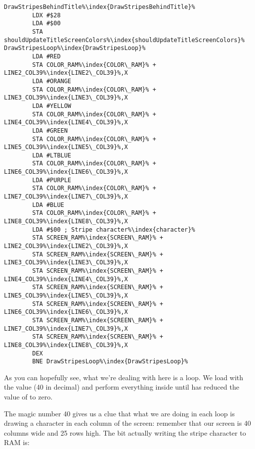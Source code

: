 \begin{lstlisting}[caption=The 'stripe' character\index{character}.,escapechar=\%]
DrawStripesBehindTitle%\index{DrawStripesBehindTitle}%
        LDX #$28
        LDA #$00
        STA shouldUpdateTitleScreenColors%\index{shouldUpdateTitleScreenColors}%
DrawStripesLoop%\index{DrawStripesLoop}%   
        LDA #RED
        STA COLOR_RAM%\index{COLOR\_RAM}% + LINE2_COL39%\index{LINE2\_COL39}%,X
        LDA #ORANGE
        STA COLOR_RAM%\index{COLOR\_RAM}% + LINE3_COL39%\index{LINE3\_COL39}%,X
        LDA #YELLOW
        STA COLOR_RAM%\index{COLOR\_RAM}% + LINE4_COL39%\index{LINE4\_COL39}%,X
        LDA #GREEN
        STA COLOR_RAM%\index{COLOR\_RAM}% + LINE5_COL39%\index{LINE5\_COL39}%,X
        LDA #LTBLUE
        STA COLOR_RAM%\index{COLOR\_RAM}% + LINE6_COL39%\index{LINE6\_COL39}%,X
        LDA #PURPLE
        STA COLOR_RAM%\index{COLOR\_RAM}% + LINE7_COL39%\index{LINE7\_COL39}%,X
        LDA #BLUE
        STA COLOR_RAM%\index{COLOR\_RAM}% + LINE8_COL39%\index{LINE8\_COL39}%,X
        LDA #$00 ; Stripe character%\index{character}%
        STA SCREEN_RAM%\index{SCREEN\_RAM}% + LINE2_COL39%\index{LINE2\_COL39}%,X
        STA SCREEN_RAM%\index{SCREEN\_RAM}% + LINE3_COL39%\index{LINE3\_COL39}%,X
        STA SCREEN_RAM%\index{SCREEN\_RAM}% + LINE4_COL39%\index{LINE4\_COL39}%,X
        STA SCREEN_RAM%\index{SCREEN\_RAM}% + LINE5_COL39%\index{LINE5\_COL39}%,X
        STA SCREEN_RAM%\index{SCREEN\_RAM}% + LINE6_COL39%\index{LINE6\_COL39}%,X
        STA SCREEN_RAM%\index{SCREEN\_RAM}% + LINE7_COL39%\index{LINE7\_COL39}%,X
        STA SCREEN_RAM%\index{SCREEN\_RAM}% + LINE8_COL39%\index{LINE8\_COL39}%,X
        DEX
        BNE DrawStripesLoop%\index{DrawStripesLoop}%

\end{lstlisting}

As you can hopefully see, what we're dealing with here is a loop. We load  with the value  (40 in decimal)
and perform everything inside  until  has reduced the value of  to zero.

The magic number 40 gives us a clue that what we are doing in each loop is drawing a character in each column of the screen:
remember that our screen is 40 columns wide and 25 rows high. The bit actually writing the stripe character to RAM is:

